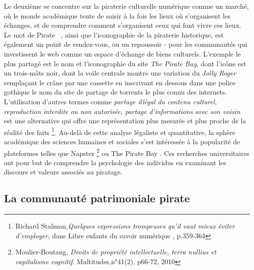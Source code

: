 Le deuxième se concentre sur la piraterie culturelle numérique comme un marché, où le monde académique tente de saisir à la fois les lieux où s'organisent les échanges, et de comprendre comment s'organisent ceux qui font vivre ces lieux. Le mot de \guillemetleft  Pirate \guillemetright~, ainsi que l'iconographie de la piraterie historique, est également un point de rendez-vous, ou un repoussoir - pour les communautés qui investissent le web comme un espace d'échange de biens culturels. L'exemple le plus partagé est le nom et l'iconographie du site \textit{The Pirate Bay}, dont l'icône est un trois-mâts noir, dont la voile centrale montre une variation du \textit{Jolly Roger} remplaçant le crâne par une cassette en inscrivant en dessous dans une police gothique le nom du site de partage de torrents le plus connu des internets. L'utilisation d'autres termes comme \textit{partage illégal du contenu culturel, reproduction interdite ou non autorisée, partage d'informations avec son voisin} est une alternative qui offre une représentation plus mesurée et plus proche de la réalité des faits \footnote{Richard Stalman,\textit{Quelques expressions trompeuses qu'il vaut mieux éviter d'employer}, dans \guillemetleft Libre enfants du savoir numérique \guillemetright, p.359-364 }. Au-delà de cette analyse légaliste et quantitative, la sphère académique des sciences humaines et sociales s'est intéressée à la popularité de plateformes telles que Napster \footnote{Moulier-Boutang, \textit{Droits de propriété intellectuelle, terra nullius et capitalisme cognitif}. Multitudes,n°41(2), p66-72, 2010} ou The Pirate Bay . Ces recherches universitaires ont pour but de comprendre la psychologie des individus en examinant les discours et valeurs associés au piratage.

\subsection*{La communauté patrimoniale pirate}

